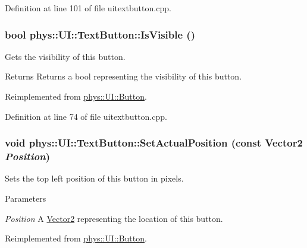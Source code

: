 Definition at line 101 of file uitextbutton.cpp.

\hypertarget{classphys_1_1UI_1_1TextButton_a505167a00d343d704df1f759cd12ed1e}{
\subsubsection[{IsVisible}]{\setlength{\rightskip}{0pt plus 5cm}bool phys::UI::TextButton::IsVisible ()}}
\label{df/d03/classphys_1_1UI_1_1TextButton_a505167a00d343d704df1f759cd12ed1e}


Gets the visibility of this button. 

\begin{DoxyReturn}{Returns}
Returns a bool representing the visibility of this button. 
\end{DoxyReturn}


Reimplemented from \hyperlink{classphys_1_1UI_1_1Button_a2bca8ace690157fa2646bcf1cb54397a}{phys::UI::Button}.



Definition at line 74 of file uitextbutton.cpp.

\hypertarget{classphys_1_1UI_1_1TextButton_a717a2a7fdcf625e833764381989c4b56}{
\subsubsection[{SetActualPosition}]{\setlength{\rightskip}{0pt plus 5cm}void phys::UI::TextButton::SetActualPosition (const {\bf Vector2} {\em Position})}}
\label{df/d03/classphys_1_1UI_1_1TextButton_a717a2a7fdcf625e833764381989c4b56}


Sets the top left position of this button in pixels. 


\begin{DoxyParams}{Parameters}
\item[{\em Position}]A \hyperlink{classphys_1_1Vector2}{Vector2} representing the location of this button. \end{DoxyParams}


Reimplemented from \hyperlink{classphys_1_1UI_1_1Button_ad5ad1d5f72f52750c3211e7b812237a8}{phys::UI::Button}.



